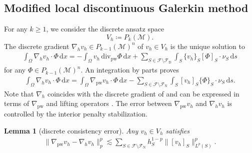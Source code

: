 \documentclass[a4paper]{amsart}
\numberwithin{equation}{section}
\renewcommand{\d}[1]{\,\mathrm{d}#1}
\renewcommand{\div}{\mathrm{div}}
\newcommand{\Mcal}{\mathcal{M}}
\newcommand{\pw}{\mathrm{pw}}
\newtheorem{lemma}[theorem]{Lemma}
\theoremstyle{remark}
\begin{document}
\subsection{Modified local discontinuous Galerkin method}\label{sec:discrete-spaces}
For any $k \geq 1$,
we consider the discrete ansatz space 
$$V_h \coloneqq P_{k}(\mathcal{M}).$$
The discrete gradient $\nabla_h v_h \in P_{k-1}(\Mcal)^n$ of $v_h \in V_h$ is the unique solution to
\begin{align}\label{def:discrete-gradient}
 	\int_\Omega \nabla_h v_h \cdot \Phi \d{x} = - \int_\Omega v_h\, \div_\pw \Phi \d{x} + \sum_{S \in \mathcal{F}\setminus\mathcal{F}_\mathrm{D}} \int_S \{v_h\}_S [\Phi]_S \cdot \nu_S \d{s}
\end{align}
for any $\Phi \in P_{k-1}(\Mcal)^n$.
An integration by parts proves
\begin{align}\label{def:ldg-dicrete-gradient}
	\int_\Omega \nabla_h v_h \cdot \Phi \d{x}
	= \int_\Omega \nabla_\pw v_h \cdot \Phi \d{x} - \sum_{S \in \mathcal{F}\setminus\mathcal{F}_\mathrm{N}} \int_S [v_h]_S \{\Phi\}_S\cdot \nu_S \d{s}.
\end{align}
Note that $\nabla_h$ coincides with the discrete gradient of \cite[Section 4.3.2]{DiPietroErn2012} and can be expressed in terms of $\nabla_\pw$ and lifting operators \cite{BrezziManziniMariniPietraRusso2000}. The error between $\nabla_\pw v_h$ and $\nabla_h v_h$ is controlled by the interior penalty stabilization.
\begin{lemma}[discrete consistency error]\label{lem:discrete-consistency-error}
	Any $v_h \in V_h$ satisfies
	\begin{align*}
		\|\nabla_\pw v_h - \nabla_h v_h\|_{p}^p \lesssim \sum_{S \in \mathcal{F} \setminus \mathcal{F}_\mathrm{N}} h_S^{1-p}\|[v_h]_S\|_{L^p(S)}^p.
	\end{align*}
\end{lemma}
\end{document}
